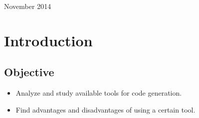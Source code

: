 \documentclass{article}
\begin{document}
\begin{titlepage}
\begin{center}
  \vspace{15 mm}


  {\large November 2014}\\[3cm] %




  \vfill %
  \end{center}
  \end{titlepage}



  \section{Introduction}

  \subsection{Objective}

  \begin{itemize}
    \item Analyze and study available tools for code generation.
    \item Find advantages and disadvantages of using a certain tool.
  \end{itemize}
\end{document}
